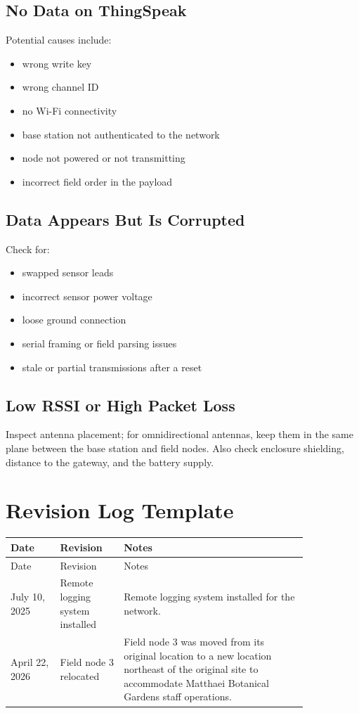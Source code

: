 \documentclass[11pt]{article}
\begin{document}
\subsection{No Data on ThingSpeak}
Potential causes include:
\begin{itemize}
    \item wrong write key
    \item wrong channel ID
    \item no Wi-Fi connectivity
    \item base station not authenticated to the network
    \item node not powered or not transmitting
    \item incorrect field order in the payload
\end{itemize}

\subsection{Data Appears But Is Corrupted}
Check for:
\begin{itemize}
    \item swapped sensor leads
    \item incorrect sensor power voltage
    \item loose ground connection
    \item serial framing or field parsing issues
    \item stale or partial transmissions after a reset
\end{itemize}

\subsection{Low RSSI or High Packet Loss}
Inspect antenna placement; for omnidirectional antennas, keep them in the same plane between the base station and field nodes. Also check enclosure shielding, distance to the gateway, and the battery supply.

\section{Revision Log Template}
\begin{longtable}{>{\raggedright\arraybackslash}p{0.14\linewidth} >{\raggedright\arraybackslash}p{0.18\linewidth} >{\raggedright\arraybackslash}p{0.52\linewidth}}
\toprule
Date & Revision & Notes \\
\midrule
\endfirsthead
\toprule
Date & Revision & Notes \\
\midrule
\endhead
July 10, 2025 & Remote logging system installed & Remote logging system installed for the network. \\
April 22, 2026 & Field node 3 relocated & Field node 3 was moved from its original location to a new location northeast of the original site to accommodate Matthaei Botanical Gardens staff operations. \\
\bottomrule
\end{longtable}
\end{document}
